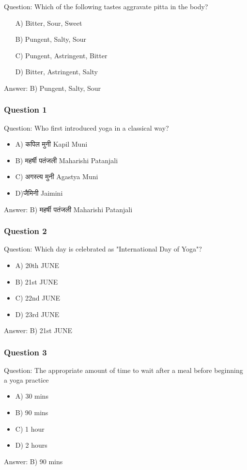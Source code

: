 \begin{frame}[fragile]\frametitle{}

Question: Which of the following tastes aggravate pitta in the body?

\begin{itemize}
\item[A)] Bitter, Sour, Sweet
\item[B)] Pungent, Salty, Sour
\item[C)] Pungent, Astringent, Bitter
\item[D)] Bitter, Astringent, Salty
\end{itemize}

Answer: B) Pungent, Salty, Sour
\end{frame}

\begin{frame}[fragile]\frametitle{Question 1}
Question: Who first introduced yoga in a classical way?
\begin{itemize}
\item A) कपिल मुनी Kapil Muni
\item B) महर्षी पतंजली  Maharishi Patanjali
\item C) अगस्त्य मुनी Agastya Muni
\item D)जैमिनी Jaimini
\end{itemize}
Answer: B) महर्षी पतंजली  Maharishi Patanjali
\end{frame}

\begin{frame}[fragile]\frametitle{Question 2}
Question: Which day is celebrated as "International Day of Yoga"?
\begin{itemize}
\item A) 20th JUNE
\item B) 21st JUNE
\item C) 22nd JUNE
\item D) 23rd JUNE
\end{itemize}
Answer: B) 21st JUNE
\end{frame}

\begin{frame}[fragile]\frametitle{Question 3}
Question: The appropriate amount of time to wait after a meal before beginning a yoga practice
\begin{itemize}
\item A) 30 mins
\item B) 90 mins
\item C) 1 hour
\item D) 2 hours
\end{itemize}
Answer: B) 90 mins
\end{frame}


